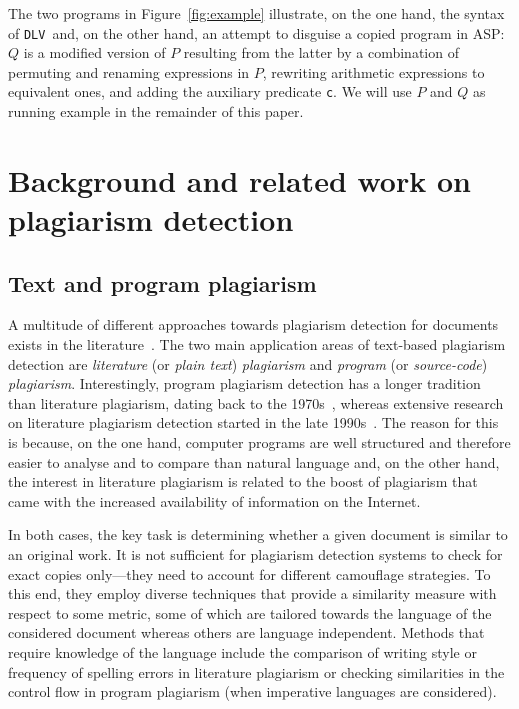 \documentclass{tlp}
\newcommand{\dlv}{\texttt{DLV}\xspace}
\begin{document}
The two programs in Figure~\ref{fig:example} illustrate, on the one hand, the syntax of \dlv\ and, on the other hand, an attempt to disguise a copied program in ASP: $Q$ is a modified version of $P$ resulting from the latter by a combination of permuting and renaming expressions in
$P$, rewriting  arithmetic expressions to equivalent ones,  and  adding the  auxiliary predicate {\tt c}.
We will use $P$ and $Q$ as running example in the remainder of this paper.

\section{Background and related work on plagiarism detection}\label{sec:background}


\subsection{Text and program plagiarism}
A multitude of different approaches towards plagiarism detection for documents
exists in the literature~\cite{maurer2006plagiarism}. 
The  two main application areas of text-based plagiarism detection are
\emph{literature} (or \emph{plain text}) \emph{plagiarism} and \emph{program} (or \emph{source-code}) \emph{plagiarism}.
Interestingly, program plagiarism detection has a  longer tradition than literature plagiarism,
dating back to the 1970s~\cite{ottenstein76},
whereas extensive research on literature plagiarism detection started in the late 1990s~\cite{austinbrown99,Farringdon96analysingfor}.
The reason for this is because, on the one hand,  computer programs are well structured
and therefore easier to analyse and to compare than natural language
and, on the other hand, the  interest in literature plagiarism
is related to the boost of plagiarism that came with
the increased availability of information on the Internet.

In both cases, the key task is determining whether a given document 
is similar to an original work.
It is not sufficient for plagiarism detection systems to check for  exact copies only---they need to account
for different camouflage strategies. 
To this end, they employ diverse techniques that
provide a similarity measure with respect to some metric,
some of which are tailored towards the language of the considered document 
whereas others are language independent.
Methods that require knowledge of the language include the
comparison of writing style or frequency of spelling errors in literature plagiarism or checking similarities in the control flow in program plagiarism (when imperative languages are considered).
\end{document}
